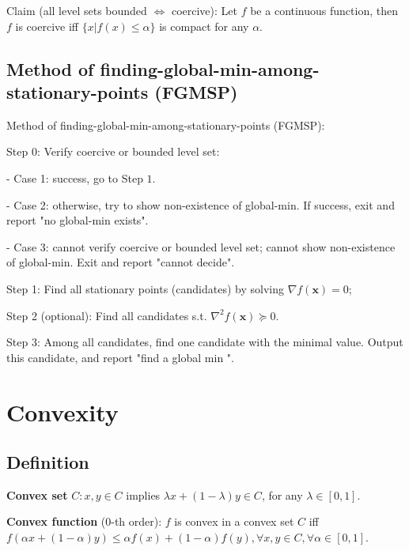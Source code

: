 \documentclass[11pt,a4paper]{article}
\begin{document}
Claim (all level sets bounded $\Leftrightarrow$ coercive): Let $f$ be a continuous function, then $f$ is coercive iff $\{x | f(x) \leq \alpha\}$ is compact for any $\alpha$.

\subsection{Method of finding-global-min-among-stationary-points (FGMSP)}
Method of finding-global-min-among-stationary-points (FGMSP):

Step 0: Verify coercive or bounded level set:

- Case 1: success, go to Step $1 .$

- Case 2: otherwise, try to show non-existence of global-min. If success, exit and report "no global-min exists".

- Case 3: cannot verify coercive or bounded level set; cannot show non-existence of global-min. Exit and report "cannot decide".

Step 1: Find all stationary points (candidates) by solving $\nabla f(\mathbf{x})=0$;

Step 2 (optional): Find all candidates s.t. $\nabla^{2} f(\mathbf{x}) \succeq 0$.

Step 3: Among all candidates, find one candidate with the minimal value. Output this candidate, and report "find a global $\mathrm{min}$ ".






\section{Convexity}
\subsection{Definition}
\textbf{Convex set} $C: x, y \in C$ implies $\lambda x+(1-\lambda) y \in C$, for any $\lambda \in[0,1]$.

\textbf{Convex function} (0-th order): $f$ is convex in a convex set $C$ iff $f(\alpha x+(1-\alpha) y) \leq \alpha f(x)+(1-\alpha) f(y), \forall x, y \in C, \forall \alpha \in[0,1] .$
\end{document}
